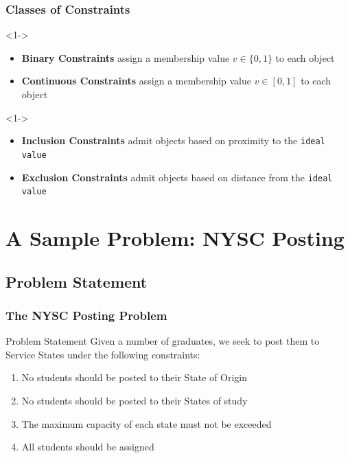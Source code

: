 \documentclass[10pt]{beamer}
\begin{document}
			\begin{frame}
				\frametitle{Classes of Constraints}
				\vfill
				\begin{definition}<1->
					\begin{itemize}
						\item \textbf{Binary Constraints} assign a membership value $v \in \{0,1\}$ to each object
						\item \textbf{Continuous Constraints} assign a membership value $v \in [0,1]$ to each object
					\end{itemize}
				\end{definition}
				\begin{definition}<1->
					\begin{itemize}
						\item \textbf{Inclusion Constraints} admit objects based on proximity to the \texttt{ideal value}
						\item \textbf{Exclusion Constraints} admit objects based on distance from the \texttt{ideal value}
					\end{itemize}
				\end{definition}
			\end{frame}

	\section{A Sample Problem: NYSC Posting}
		\subsection{Problem Statement}
			\begin{frame}
				\frametitle{The NYSC Posting Problem}
				\begin{block}{Problem Statement}
					Given a number of graduates, we seek to post them to Service States under the following constraints:
					\begin{enumerate}
						\item No students should be posted to their State of Origin
						\item No students should be posted to their States of study
						\item The maximum capacity of each state must not be exceeded%
						\item All students should be assigned
					\end{enumerate}
				\end{block}		
			\end{frame}
\end{document}

